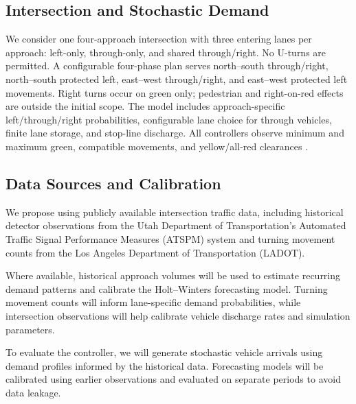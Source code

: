 \documentclass[letterpaper,12pt,conference]{ieeeconf}
\begin{document}
\subsection{Intersection and Stochastic Demand}
We consider one four-approach intersection with three entering lanes per approach: left-only, through-only, and shared through/right. No U-turns are permitted. A configurable four-phase plan serves north--south through/right, north--south protected left, east--west through/right, and east--west protected left movements. Right turns occur on green only; pedestrian and right-on-red effects are outside the initial scope. The model includes approach-specific left/through/right probabilities, configurable lane choice for through vehicles, finite lane storage, and stop-line discharge. All controllers observe minimum and maximum green, compatible movements, and yellow/all-red clearances \cite{signalmanual2015}.


\subsection{Data Sources and Calibration}

We propose using publicly available intersection traffic data, including historical detector observations from the Utah Department of Transportation's Automated Traffic Signal Performance Measures (ATSPM) system and turning movement counts from the Los Angeles Department of Transportation (LADOT).

Where available, historical approach volumes will be used to estimate recurring demand patterns and calibrate the Holt--Winters forecasting model. Turning movement counts will inform lane-specific demand probabilities, while intersection observations will help calibrate vehicle discharge rates and simulation parameters.

To evaluate the controller, we will generate stochastic vehicle arrivals using demand profiles informed by the historical data. Forecasting models will be calibrated using earlier observations and evaluated on separate periods to avoid data leakage.
\end{document}
